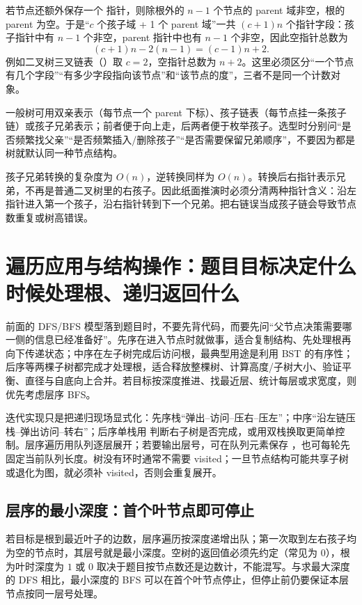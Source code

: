 \documentclass[UTF8,fontset=none,11pt,a4paper]{ctexart}
\begin{document}
若节点还额外保存一个  指针，则除根外的 $n-1$ 个节点的 parent 域非空，根的 parent 为空。于是“$c$ 个孩子域 + 1 个 parent 域”一共 $(c+1)n$ 个指针字段：孩子指针中有 $n-1$ 个非空，parent 指针中也有 $n-1$ 个非空，因此空指针总数为
\[
(c+1)n-2(n-1)=(c-1)n+2.
\]
例如二叉树三叉链表（）取 $c=2$，空指针总数为 $n+2$。这里必须区分“一个节点有几个字段”“有多少字段指向该节点”和“该节点的度”，三者不是同一个计数对象。

一般树可用双亲表示（每节点一个 parent 下标）、孩子链表（每节点挂一条孩子链）或孩子兄弟表示；前者便于向上走，后两者便于枚举孩子。选型时分别问“是否频繁找父亲”“是否频繁插入/删除孩子”“是否需要保留兄弟顺序”，不要因为都是树就默认同一种节点结构。

孩子兄弟转换的复杂度为 $O(n)$，逆转换同样为 $O(n)$。转换后右指针表示兄弟，不再是普通二叉树里的右孩子。因此纸面推演时必须分清两种指针含义：沿左指针进入第一个孩子，沿右指针转到下一个兄弟。把右链误当成孩子链会导致节点数重复或树高错误。

\section{遍历应用与结构操作：题目目标决定什么时候处理根、递归返回什么}
前面的 DFS/BFS 模型落到题目时，不要先背代码，而要先问“父节点决策需要哪一侧的信息已经准备好”。先序在进入节点时就做事，适合复制结构、先处理根再向下传递状态；中序在左子树完成后访问根，最典型用途是利用 BST 的有序性；后序等两棵子树都完成才处理根，适合释放整棵树、计算高度/子树大小、验证平衡、直径与自底向上合并。若目标按深度推进、找最近层、统计每层或求宽度，则优先考虑层序 BFS。

迭代实现只是把递归现场显式化：先序栈“弹出--访问--压右--压左”；中序“沿左链压栈--弹出访问--转右”；后序单栈用  判断右子树是否完成，或用双栈换取更简单控制。层序遍历用队列逐层展开；若要输出层号，可在队列元素保存 ，也可每轮先固定当前队列长度。树没有环时通常不需要 visited；一旦节点结构可能共享子树或退化为图，就必须补 visited，否则会重复展开。

\subsection{层序的最小深度：首个叶节点即可停止}
若目标是根到最近叶子的边数，层序遍历按深度递增出队；第一次取到左右孩子均为空的节点时，其层号就是最小深度。空树的返回值必须先约定（常见为 $0$），根为叶时深度为 $1$ 或 $0$ 取决于题目按节点数还是边数计，不能混写。与求最大深度的 DFS 相比，最小深度的 BFS 可以在首个叶节点停止，但停止前仍要保证本层节点按同一层号处理。
\end{document}
